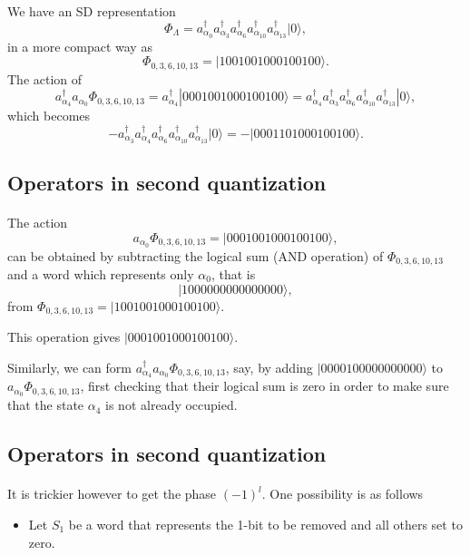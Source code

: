 \documentclass[%
oneside,                 %
final,                   %
10pt]{article}
\begin{document}
\paragraph{}
We have an SD representation
\[
\Phi_{\Lambda} = a_{\alpha_0}^{\dagger} a_{\alpha_3}^{\dagger} a_{\alpha_6}^{\dagger} a_{\alpha_{10}}^{\dagger} a_{\alpha_{13}}^{\dagger} |0\rangle,
\]
in a more compact way as
\[
\Phi_{0,3,6,10,13} = |1001001000100100\rangle.
\]
The action of
\[
a^{\dagger}_{\alpha_4}a_{\alpha_0}\Phi_{0,3,6,10,13} = a^{\dagger}_{\alpha_4}|0001001000100100\rangle=a^{\dagger}_{\alpha_4}a_{\alpha_3}^{\dagger} a_{\alpha_6}^{\dagger} a_{\alpha_{10}}^{\dagger} a_{\alpha_{13}}^{\dagger} |0\rangle,
\]
which becomes
\[
-a_{\alpha_3}^{\dagger} a^{\dagger}_{\alpha_4} a_{\alpha_6}^{\dagger} a_{\alpha_{10}}^{\dagger} a_{\alpha_{13}}^{\dagger} |0\rangle=-|0001101000100100\rangle.
\]



\subsection*{Operators in second quantization}

\paragraph{}
The action
\[
a_{\alpha_0}\Phi_{0,3,6,10,13} = |0001001000100100\rangle,
\]
can be obtained by subtracting the logical sum (AND operation) of $\Phi_{0,3,6,10,13}$ and 
a word which represents only $\alpha_0$, that is
\[
|1000000000000000\rangle,
\] 
from $\Phi_{0,3,6,10,13}= |1001001000100100\rangle$.

This operation gives $|0001001000100100\rangle$. 

Similarly, we can form $a^{\dagger}_{\alpha_4}a_{\alpha_0}\Phi_{0,3,6,10,13}$, say, by adding 
$|0000100000000000\rangle$ to $a_{\alpha_0}\Phi_{0,3,6,10,13}$, first checking that their logical sum
is zero in order to make sure that the state $\alpha_4$ is not already occupied.



\subsection*{Operators in second quantization}

\paragraph{}
It is trickier however to get the phase $(-1)^l$. 
One possibility is as follows
\begin{itemize}
\item Let $S_1$ be a word that represents the 1-bit to be removed and all others set to zero.
\end{itemize}
\end{document}
